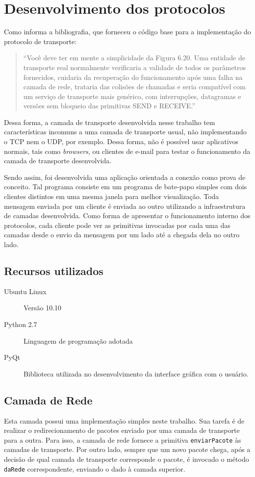 \documentclass[brazil,times,12pt]{abnt}
\begin{document}
\section*{Desenvolvimento dos protocolos}
	Como informa a bibliografia, que forneceu o código base para a implementação do
	protocolo de transporte:
	
	\begin{quote}
	``Você deve ter em mente a simplicidade da Figura 6.20. Uma entidade de transporte real
	normalmente verificaria a validade de todos os parâmetros fornecidos, cuidaria
	da recuperação do funcionamento após uma falha na camada de rede, trataria das
	colisões de chamadas e seria compatível com um serviço de transporte mais
	genérico, com interrupções, datagramas e versões sem bloqueio das primitivas
	SEND e RECEIVE.'' \cite{tanenbaum:redes-computadores}
	\end{quote}
	
	Dessa forma, a camada de transporte desenvolvida nesse trabalho tem
	características incomuns a uma camada de transporte usual, não implementando o
	TCP nem o UDP, por exemplo. Dessa forma, não é possível usar aplicativos
	normais, tais como \emph{browsers}, ou clientes de e-mail para testar o
	funcionamento da camada de transporte desenvolvida.
	
	Sendo assim, foi desenvolvida uma aplicação orientada a conexão como prova de
	conceito. Tal programa consiste em um programa de bate-papo simples com dois
	clientes distintos em uma mesma janela para melhor visualização. Toda mensagem
	enviada por um cliente é enviada ao outro utilizando a infraestrutura de
	camadas desenvolvida. Como forma de apresentar o funcionamento interno dos
	protocolos, cada cliente pode ver as primitivas invocadas por cada uma das
	camadas desde o envio da mensagem por um lado até a chegada dela no outro lado.
	
\subsection*{Recursos utilizados}
	\begin{description}
	  \item[Ubuntu Linux] Versão 10.10
	  \item[Python 2.7] Linguagem de programação adotada
	  \item[PyQt] Biblioteca utilizada no desenvolvimento da interface gráfica com
	  o usuário.
	\end{description}

\subsection*{Camada de Rede}
	Esta camada possui uma implementação simples neste trabalho. Sua tarefa é de
	realizar o redirecionamento de pacotes enviado por uma camada de transporte
	para a outra. Para isso, a camada de rede fornece a primitiva
	\texttt{enviarPacote} às camadas de transporte. Por outro lado, sempre que um
	novo pacote chega, após a decisão de qual camada de transporte corresponde o
	pacote, é invocado o método \texttt{daRede} correspondente, enviando o dado à
	camada superior.
\end{document}
